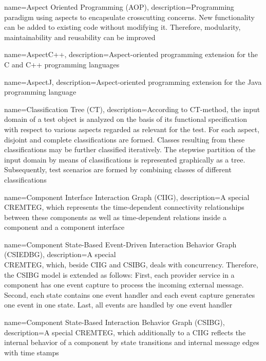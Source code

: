 {
	name={Aspect Oriented Programming (AOP)},
	description={Programming paradigm using aspects to encapsulate crosscutting concerns. New functionality can be added to existing code without modifying it. Therefore, modularity, maintainability and reusability can be improved \cite{Kiczales1997}}
}

{
	name={AspectC++},
	description={Aspect-oriented programming extension for the C and C++ programming languages \cite{C++}}
}

{
	name={AspectJ},
	description={Aspect-oriented programming extension for the Java programming language \cite{J}}
}

{
	name={Classification Tree (CT)},
	description={According to CT-method, the input domain of a test object is analyzed on the basis of its functional specification with respect to various aspects regarded as relevant for the test. For each aspect, disjoint and complete classifications are formed. Classes resulting from these classifications may be further classified iteratively. The stepwise partition of the input domain by means of classifications is represented graphically as a tree. Subsequently, test scenarios are formed by combining classes of different classifications \cite{Conrad2005}}
}

{
	name={Component Interface Interaction Graph (CIIG)},
	description={A special CREMTEG, which represents the time-dependent connectivity relationships between these components as well as time-dependent relations inside a component and a component interface \cite{Guan2015}}
}

{
	name={Component State-Based Event-Driven Interaction Behavior Graph (CSIEDBG)},
	description={A special \\CREMTEG, which, beside CIIG and CSIBG, deals with concurrency. Therefore, the CSIBG model is extended as follows: First, each provider service in a component has one event capture to process the incoming external message. Second, each state contains one event handler and each event capture generates one event in one state. Last, all events are handled by one event handler \cite{Guan2015}}
}

{
	name={Component State-Based Interaction Behavior Graph (CSIBG)},
	description={A special CREMTEG, which additionally to a CIIG reflects the internal behavior of a component by state transitions and internal message edges with time stamps \cite{Guan2015}}
}

